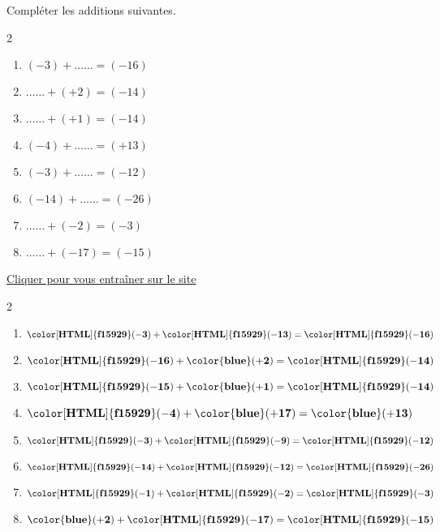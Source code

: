 \begin{exercice*}
    Compléter les additions suivantes.
    \begin{multicols}2
        \begin{enumerate}            
            \item $ (-3) + \ldots\ldots = (-16) $
            \item $ \ldots\ldots + (+2) = (-14) $
            \item $ \ldots\ldots + (+1) = (-14) $
            \item $ (-4) + \ldots\ldots = (+13) $
            \item $ (-3) + \ldots\ldots = (-12) $
            \item $ (-14) + \ldots\ldots = (-26) $
            \item $ \ldots\ldots + (-2) = (-3) $
            \item $ \ldots\ldots + (-17) = (-15) $          
        \end{enumerate}
    \end{multicols}

    \href{https://coopmaths.fr/mathalea.html?ex=5R20-2,s=20,s2=false,n=10,i=1&v=ex&z=1}{Cliquer pour vous entraîner sur le site \mathaleaLogo} 
\end{exercice*}
\begin{corrige}
    \phantom{rrr}    
    \begin{multicols}2
        \begin{enumerate}
            \item $ \mathbf{{\color[HTML]{f15929}(-3)}} + \mathbf{{\color[HTML]{f15929}(-13)}} = \mathbf{{\color[HTML]{f15929}(-16)}} $
            \item $ \mathbf{{\color[HTML]{f15929}(-16)}} + \mathbf{{\color{blue}(+2)}} = \mathbf{{\color[HTML]{f15929}(-14)}} $
            \item $ \mathbf{{\color[HTML]{f15929}(-15)}} + \mathbf{{\color{blue}(+1)}} = \mathbf{{\color[HTML]{f15929}(-14)}} $
            \item $ \mathbf{{\color[HTML]{f15929}(-4)}} + \mathbf{{\color{blue}(+17)}} = \mathbf{{\color{blue}(+13)}} $
            \item $ \mathbf{{\color[HTML]{f15929}(-3)}} + \mathbf{{\color[HTML]{f15929}(-9)}} = \mathbf{{\color[HTML]{f15929}(-12)}} $
            \item $ \mathbf{{\color[HTML]{f15929}(-14)}} + \mathbf{{\color[HTML]{f15929}(-12)}} = \mathbf{{\color[HTML]{f15929}(-26)}} $
            \item $ \mathbf{{\color[HTML]{f15929}(-1)}} + \mathbf{{\color[HTML]{f15929}(-2)}} = \mathbf{{\color[HTML]{f15929}(-3)}} $
            \item $ \mathbf{{\color{blue}(+2)}} + \mathbf{{\color[HTML]{f15929}(-17)}} = \mathbf{{\color[HTML]{f15929}(-15)}} $
        \end{enumerate}   
    \end{multicols}
\end{corrige}